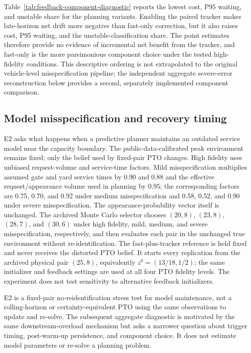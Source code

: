 \documentclass[preprint,12pt,authoryear,a4paper]{elsarticle}
\begin{document}
Table~\ref{tab:feedback-component-diagnostic} reports the lowest cost, P95 waiting, and unstable share for the planning variants. Enabling the paired tracker makes late-horizon net drift more negative than fast-only correction, but it also raises cost, P95 waiting, and the unstable-classification share. The point estimates therefore provide no evidence of incremental net benefit from the tracker, and fast-only is the more parsimonious component choice under the tested high-fidelity conditions. This descriptive ordering is not extrapolated to the original vehicle-level misspecification pipeline; the independent aggregate severe-error reconstruction below provides a second, separately implemented component comparison.

\subsection{Model misspecification and recovery timing}
\label{subsec:6-4-pto-model-fidelity-and-the-value-of-feedback-correction}

E2 asks what happens when a predictive planner maintains an outdated service model near the capacity boundary. The public-data-calibrated peak environment remains fixed; only the belief used by fixed-pair PTO changes. High fidelity uses unbiased request-volume and service-time factors. Mild misspecification multiplies assumed gate and yard service times by 0.90 and 0.88 and the effective request/appearance volume used in planning by 0.95; the corresponding factors are 0.75, 0.70, and 0.92 under medium misspecification and 0.58, 0.52, and 0.90 under severe misspecification. The appearance-probability vector itself is unchanged. The archived Monte Carlo selector chooses \((20,8)\), \((23,8)\), \((28,7)\), and \((30,6)\) under high fidelity, mild, medium, and severe misspecification, respectively, and then evaluates each pair in the unchanged true environment without re-identification. The fast-plus-tracker reference is held fixed and never receives the distorted PTO belief. It starts every replication from the archived physical pair \((25,8)\), equivalently \(z^0=(13/18,1/2)\); the same initializer and feedback settings are used at all four PTO fidelity levels. The experiment does not test sensitivity to alternative feedback initializers.

E2 is a fixed-pair no-reidentification stress test for model maintenance, not a rolling-horizon or certainty-equivalent PTO using the same observations to update and re-solve. The subsequent aggregate diagnostic is motivated by the same downstream-overload mechanism but asks a narrower question about trigger timing, post-warm-up persistence, and component choice. It does not estimate model parameters or re-solve a planning problem.
\end{document}

